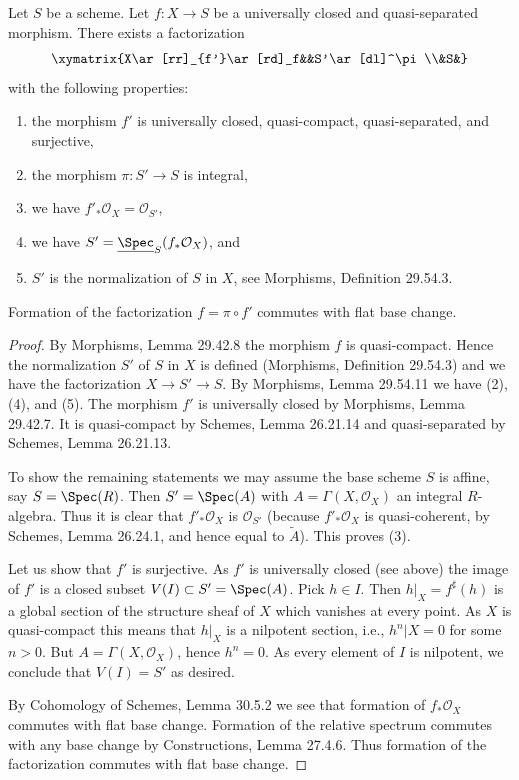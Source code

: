 
\begin{lemma}[37.53.1]
Let $S$ be a scheme. Let $f:X\to S$ be a universally closed and quasi-separated morphism. There exists a factorization
\[\xymatrix{X\ar[rr]_{f'}\ar[rd]_f&&S'\ar[dl]^\pi\\&S&}\]
with the following properties:
\begin{enumerate}
\item the morphism $f'$ is universally closed, quasi-compact, quasi-separated, and surjective,
\item the morphism $\pi:S'\to S$ is integral,
\item we have $f'_*\mathcal O_X=\mathcal O_{S'}$,
\item we have $S'=\underline{\Spec}_S(f_*\mathcal O_X)$, and
\item $S'$ is the normalization of $S$ in $X$, see Morphisms, Definition 29.54.3.
\end{enumerate}
Formation of the factorization $f=\pi\circ f'$ commutes with flat base change.
\end{lemma}
\begin{proof}
By Morphisms, Lemma 29.42.8 the morphism $f$ is quasi-compact. Hence the normalization $S'$ of $S$ in $X$ is defined (Morphisms, Definition 29.54.3) and we have the factorization $X\to S'\to S$. By Morphisms, Lemma 29.54.11 we have (2), (4), and (5). The morphism $f'$ is universally closed by Morphisms, Lemma 29.42.7. It is quasi-compact by Schemes, Lemma 26.21.14 and quasi-separated by Schemes, Lemma 26.21.13.

To show the remaining statements we may assume the base scheme $S$ is affine, say $S=\Spec(R)$. Then $S'=\Spec(A)$ with $A=\Gamma(X,\mathcal O_X)$ an integral $R$-algebra. Thus it is clear that $f'_*\mathcal O_X$ is $\mathcal O_{S'}$ (because $f'_*\mathcal O_X$ is quasi-coherent, by Schemes, Lemma 26.24.1, and hence equal to $\widetilde A$). This proves (3).

Let us show that $f'$ is surjective. As $f'$ is universally closed (see above) the image of $f'$ is a closed subset $V(I)\subset S'=\Spec(A)$. Pick $h\in I$. Then $h|_X=f^\sharp(h)$ is a global section of the structure sheaf of $X$ which vanishes at every point. As $X$ is quasi-compact this means that $h|_X$ is a nilpotent section, i.e., $h^n|X=0$ for some $n>0$. But $A=\Gamma(X,\mathcal O_X)$, hence $h^n=0$. As every element of $I$ is nilpotent, we conclude that $V(I)=S'$ as desired.

By Cohomology of Schemes, Lemma 30.5.2 we see that formation of $f_*\mathcal O_X$ commutes with flat base change. Formation of the relative spectrum commutes with any base change by Constructions, Lemma 27.4.6. Thus formation of the factorization commutes with flat base change.
\end{proof}

